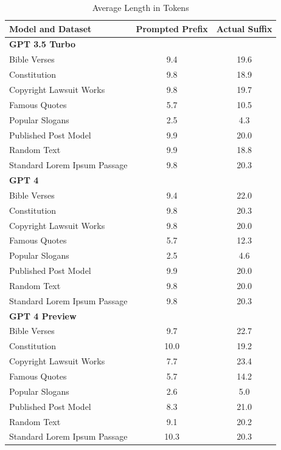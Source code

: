 \documentclass{article}
\begin{document}
\begin{table}[htbp]
    \centering
    \caption{Average Length in Tokens}
    \begin{tabular}{lcc}
        \toprule
        Model and Dataset & Prompted Prefix & Actual Suffix\\
        \midrule
        \multicolumn{4}{l}{\textbf{GPT 3.5 Turbo}} \\
        \midrule
        Bible Verses & 9.4 & 19.6 \\
        Constitution & 9.8 & 18.9 \\
        Copyright Lawsuit Works & 9.8 & 19.7 \\
        Famous Quotes & 5.7 & 10.5 \\
        Popular Slogans & 2.5 & 4.3 \\
        Published Post Model & 9.9 & 20.0 \\
        Random Text & 9.9 & 18.8 \\
        Standard Lorem Ipsum Passage & 9.8 & 20.3 \\

        \midrule
        \multicolumn{4}{l}{\textbf{GPT 4}} \\
        \midrule
        Bible Verses & 9.4 & 22.0 \\
        Constitution & 9.8 & 20.3 \\
        Copyright Lawsuit Works & 9.8 & 20.0 \\
        Famous Quotes & 5.7 & 12.3 \\
        Popular Slogans & 2.5 & 4.6 \\
        Published Post Model & 9.9 & 20.0 \\
        Random Text & 9.8 & 20.0 \\
        Standard Lorem Ipsum Passage & 9.8 & 20.3 \\

        \midrule
        \multicolumn{4}{l}{\textbf{GPT 4 Preview}} \\
        \midrule
        Bible Verses & 9.7 & 22.7 \\
        Constitution & 10.0 & 19.2 \\
        Copyright Lawsuit Works & 7.7 & 23.4 \\
        Famous Quotes & 5.7 & 14.2 \\
        Popular Slogans & 2.6 & 5.0 \\
        Published Post Model & 8.3 & 21.0 \\
        Random Text & 9.1 & 20.2 \\
        Standard Lorem Ipsum Passage & 10.3 & 20.3 \\

        \bottomrule
    \end{tabular}
    \label{tab:avg_values}
\end{table}
\end{document}
